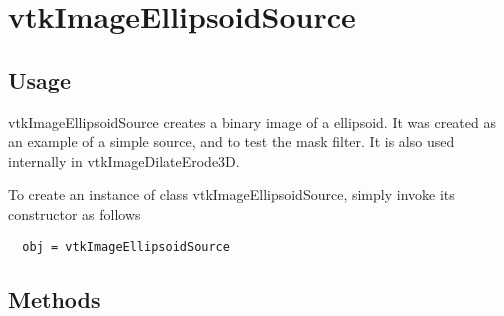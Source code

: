 \section{vtkImageEllipsoidSource}

\subsection{Usage}

 vtkImageEllipsoidSource creates a binary image of a ellipsoid.  It was created
 as an example of a simple source, and to test the mask filter.
 It is also used internally in vtkImageDilateErode3D.

To create an instance of class vtkImageEllipsoidSource, simply
invoke its constructor as follows
\begin{verbatim}
  obj = vtkImageEllipsoidSource
\end{verbatim}
\subsection{Methods}

